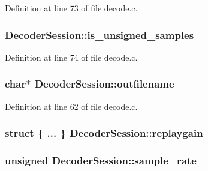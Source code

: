 Definition at line 73 of file decode.\+c.

\subsubsection[{\texorpdfstring{is\+\_\+unsigned\+\_\+samples}{is_unsigned_samples}}]{ Decoder\+Session\+::is\+\_\+unsigned\+\_\+samples}\hypertarget{struct_decoder_session_a617094acdae08080a7d95a8efc1ba898}{}\label{struct_decoder_session_a617094acdae08080a7d95a8efc1ba898}


Definition at line 74 of file decode.\+c.

\subsubsection[{\texorpdfstring{outfilename}{outfilename}}]{ char$\ast$ Decoder\+Session\+::outfilename}\hypertarget{struct_decoder_session_a66264c51e4cb1c8afcd925cc82d22418}{}\label{struct_decoder_session_a66264c51e4cb1c8afcd925cc82d22418}


Definition at line 62 of file decode.\+c.

\subsubsection[{\texorpdfstring{replaygain}{replaygain}}]{\setlength{\rightskip}{0pt plus 5cm}struct \{ ... \}   Decoder\+Session\+::replaygain}\hypertarget{struct_decoder_session_ae7d49472e7468e617b1e2c35c5f61d7b}{}\label{struct_decoder_session_ae7d49472e7468e617b1e2c35c5f61d7b}
\subsubsection[{\texorpdfstring{sample\+\_\+rate}{sample_rate}}]{\setlength{\rightskip}{0pt plus 5cm}unsigned Decoder\+Session\+::sample\+\_\+rate}\hypertarget{struct_decoder_session_a4703f569cd6deba3a8469b97a272392e}{}\label{struct_decoder_session_a4703f569cd6deba3a8469b97a272392e}


